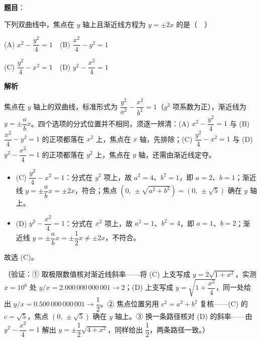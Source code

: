 \begin{answer}

\textbf{题目}：

下列双曲线中，焦点在 \(y\) 轴上且渐近线方程为 \(y=\pm 2x\) 的是（　）

(A) \(x^2-\dfrac{y^2}{4}=1\)　(B) \(\dfrac{x^2}{4}-y^2=1\)

(C) \(\dfrac{y^2}{4}-x^2=1\)　(D) \(y^2-\dfrac{x^2}{4}=1\)

\textbf{解析}

焦点在 \(y\) 轴上的双曲线，标准形式为 \(\dfrac{y^{2}}{a^{2}}-\dfrac{x^{2}}{b^{2}}=1\)（\(y^{2}\) 项系数为正），渐近线为 \(y=\pm\dfrac{a}{b}x\)。四个选项的分式位置并不相同，须逐一辨清：(A) \(x^{2}-\dfrac{y^{2}}{4}=1\) 与 (B) \(\dfrac{x^{2}}{4}-y^{2}=1\) 的正项都落在 \(x^{2}\) 上，焦点在 \(x\) 轴，先排除；(C) \(\dfrac{y^{2}}{4}-x^{2}=1\) 与 (D) \(y^{2}-\dfrac{x^{2}}{4}=1\) 的正项都落在 \(y^{2}\) 上，焦点在 \(y\) 轴，还需由渐近线定夺。

\begin{itemize}
\item (C) \(\dfrac{y^{2}}{4}-x^{2}=1\)：分式在 \(y^{2}\) 项上，故 \(a^{2}=4\)、\(b^{2}=1\)，即 \(a=2\)、\(b=1\)；渐近线 \(y=\pm\dfrac{a}{b}x=\pm 2x\)，符合；焦点 \((0,\,\pm\sqrt{a^{2}+b^{2}})=(0,\,\pm\sqrt{5})\) 确在 \(y\) 轴上。
\item (D) \(y^{2}-\dfrac{x^{2}}{4}=1\)：分式在 \(x^{2}\) 项上，故 \(a^{2}=1\)、\(b^{2}=4\)，即 \(a=1\)、\(b=2\)；渐近线 \(y=\pm\dfrac{a}{b}x=\pm\dfrac{1}{2}x\neq\pm 2x\)，不符合。
\end{itemize}

故选 (C)。

（验证：① 取极限数值核对渐近线斜率——将 (C) 上支写成 \(y=2\sqrt{1+x^{2}}\)，实测 \(x=10^{6}\) 处 \(y/x=2.000\,000\,000\,001\to 2\)；(D) 上支写成 \(y=\sqrt{1+\dfrac{x^{2}}{4}}\)，同一处给出 \(y/x=0.500\,000\,000\,001\to\dfrac{1}{2}\)。② 焦点位置另用 \(c^{2}=a^{2}+b^{2}\) 复核——(C) 的 \(c=\sqrt{5}\)，焦点 \((0,\,\pm\sqrt{5})\) 确在 \(y\) 轴上。③ 换一条路径核对 (D) 的斜率——由 \(y^{2}-\dfrac{x^{2}}{4}=1\) 解出 \(y=\pm\dfrac{1}{2}\sqrt{4+x^{2}}\)，同样给出 \(\dfrac{1}{2}\)，两条路径一致。）


\end{answer}
